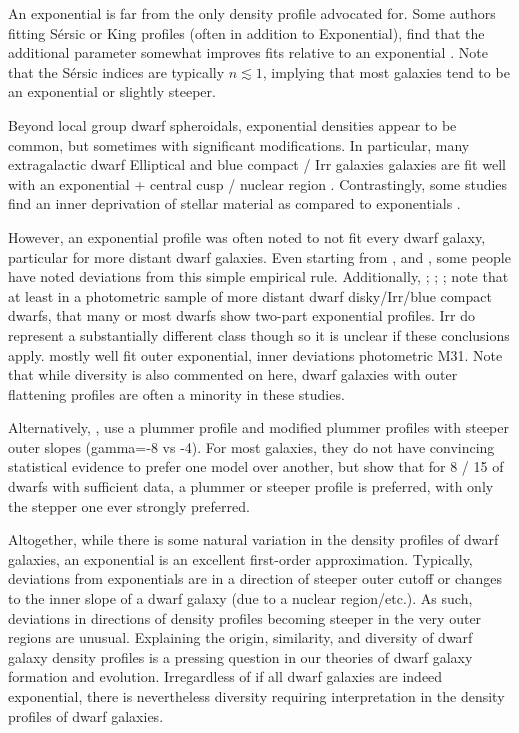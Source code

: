 An exponential is far from the only density profile advocated for. Some
authors fitting Sérsic or King profiles (often in addition to
Exponential), find that the additional parameter somewhat improves fits
relative to an exponential
\citep{IH1995, vanzee+barton+skillman2004, munoz+2018, wang+2019}. Note
that the Sérsic indices are typically \(n \lesssim 1\), implying that
most galaxies tend to be an exponential or slightly steeper.

Beyond local group dwarf spheroidals, exponential densities appear to be
common, but sometimes with significant modifications. In particular,
many extragalactic dwarf Elliptical and blue compact / Irr galaxies
galaxies are fit well with an exponential + central cusp / nuclear
region \citep[\citet{noeske+2003}]{caldwell+bothun1987}. Contrastingly,
some studies find an inner deprivation of stellar material as compared
to exponentials \citep[e.g.,][]{caldwell+1992, makarov+2012}.

However, an exponential profile was often noted to not fit every dwarf
galaxy, particular for more distant dwarf galaxies. Even starting from
\citet{aparicio1997}, and \citet[for coma cluster
dE]{graham+guzman2003}, some people have noted deviations from this
simple empirical rule. Additionally, \citet{hunter+elmegreen};
\citet{herrmann+hunter+elmegreen2013};
\citet{herrmann+hunter+elmegreen2016}; \citet{lee+2018} note that at
least in a photometric sample of more distant dwarf disky/Irr/blue
compact dwarfs, that many or most dwarfs show two-part exponential
profiles. Irr do represent a substantially different class though so it
is unclear if these conclusions apply. \citet{caldwell+1992} mostly well
fit outer exponential, inner deviations photometric M31. Note that while
diversity is also commented on here, dwarf galaxies with outer
flattening profiles are often a minority in these studies.

Alternatively, \citet{moskowitz+walker2020}, use a plummer profile and
modified plummer profiles with steeper outer slopes (gamma=-8 vs -4).
For most galaxies, they do not have convincing statistical evidence to
prefer one model over another, but show that for 8 / 15 of dwarfs with
sufficient data, a plummer or steeper profile is preferred, with only
the stepper one ever strongly preferred.

Altogether, while there is some natural variation in the density
profiles of dwarf galaxies, an exponential is an excellent first-order
approximation. Typically, deviations from exponentials are in a
direction of steeper outer cutoff or changes to the inner slope of a
dwarf galaxy (due to a nuclear region/etc.). As such, deviations in
directions of density profiles becoming steeper in the very outer
regions are unusual. Explaining the origin, similarity, and diversity of
dwarf galaxy density profiles is a pressing question in our theories of
dwarf galaxy formation and evolution. Irregardless of if all dwarf
galaxies are indeed exponential, there is nevertheless diversity
requiring interpretation in the density profiles of dwarf galaxies.

